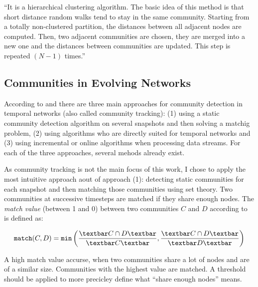 ``It is a hierarchical clustering algorithm. The basic idea of this method is that short distance random walks tend to stay in the same community. Starting from a totally non-clustered partition, the distances between all adjacent nodes are computed. Then, two adjacent communities are chosen, they are merged into a new one and the distances between communities are updated. This step is repeated $(N - 1)$ times.''~\cite{yang2016comparative}

\subsection{Communities in Evolving Networks}
\label{sec:bg:tracking}
According to \textcite{aynaud2013communities} and \textcite{brodka2014community} there are three main approaches for community detection in temporal networks (also called community tracking): (1) using a static community detection algorithm on several snapshots and then solving a matchig problem, (2) using algorithms who are directly suited for temporal networks and (3) using incremental or online algorithms when processing data streams. For each of the three approaches, several mehods already exist.

As community tracking is not the main focus of this work, I chose to apply the most intuitive approach aout of approach (1): detecting static communities for each snapshot and then matching those communities using set theory.  Two communities at successive timesteps are matched if they share enough nodes. The \emph{match value} (between 1 and 0) between two communities $C$ and $D$ according to~\cite{hopcroft2004tracking} is defined as:

\begin{equation}
\label{eq:match}
\texttt{match}(C,D) = \texttt{min}\left( \frac{\textbar C\cap D \textbar}{\textbar C\textbar }, \frac{\textbar C\cap D \textbar}{\textbar D \textbar }\right)
\end{equation}

A high match value accurse, when two communities share a lot of nodes and are of a similar size. Communities with the highest value are matched. A threshold should be applied to more precicley define what ``share enough nodes'' means.
